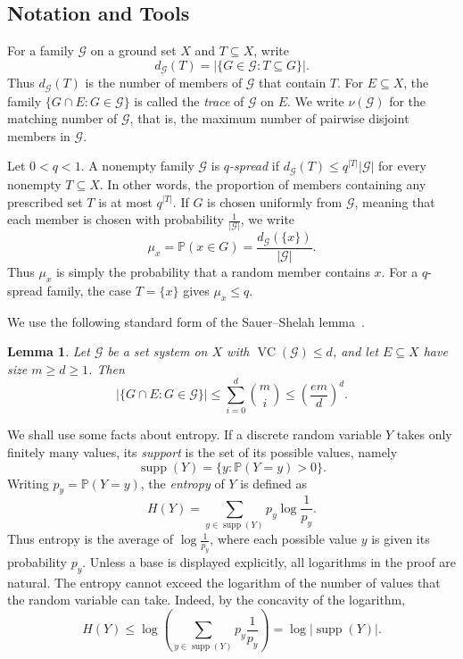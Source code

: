 \documentclass[11pt]{article}
\newtheorem{lemma}[theorem]{Lemma}
\theoremstyle{definition}
\newcommand*{\abs}[1]{\lvert#1\rvert}
\newcommand{\cG}{\mathcal{G}}
\newcommand{\VC}{\operatorname{VC}}
\begin{document}
\subsection{Notation and Tools}
For a family \(\cG\) on a ground set \(X\) and \(T\subseteq X\), write
\[
d_{\cG}(T)=\abs{\{G\in\cG:T\subseteq G\}}.
\]
Thus \(d_{\cG}(T)\) is the number of members of \(\cG\) that contain \(T\).
For \(E\subseteq X\), the family \(\{G\cap E:G\in\cG\}\) is called the \emph{trace} of \(\cG\) on \(E\). We write \(\nu(\cG)\) for the matching number of \(\cG\), that is, the maximum number of pairwise disjoint members in \(\cG\).

Let \(0<q<1\). A nonempty family \(\cG\) is \emph{\(q\)-spread} if \(d_{\cG}(T)\le q^{\abs{T}}\abs{\cG}\) for every nonempty \(T\subseteq X\). In other words, the proportion of members containing any prescribed set \(T\) is at most \(q^{\abs{T}}\). If \(G\) is chosen uniformly from \(\cG\), meaning that each member is chosen with probability \(\frac{1}{\abs{\cG}}\), we write
\[
\mu_{x}=\mathbb{P}(x\in G)=\frac{d_{\cG}(\{x\})}{\abs{\cG}}.
\]
Thus \(\mu_{x}\) is simply the probability that a random member contains \(x\). For a \(q\)-spread family, the case \(T=\{x\}\) gives \(\mu_{x}\le q\).

We use the following standard form of the Sauer--Shelah lemma~\cite{Sauer72,Shelah72,VC71}.

\begin{lemma}\label{lem:sauer}
Let \(\cG\) be a set system on \(X\) with \(\VC(\cG)\le d\), and let \(E\subseteq X\) have size \(m\ge d\ge 1\). Then
\[
\abs{\{G\cap E:G\in\cG\}}\le \sum_{i=0}^{d}\binom{m}{i}\le \left(\frac{em}{d}\right)^{d}.
\]
\end{lemma}

We shall use some facts about entropy. If a discrete random variable \(Y\) takes only finitely many values, its \emph{support} is the set of its possible values, namely
\[
\operatorname{supp}(Y)=\{y:\mathbb{P}(Y=y)>0\}.
\]
Writing \(p_{y}=\mathbb{P}(Y=y)\), the \emph{entropy} of \(Y\) is defined as
\[
H(Y)=\sum_{y\in\operatorname{supp}(Y)}p_{y}\log\frac{1}{p_{y}}.
\]
Thus entropy is the average of \(\log\frac{1}{p_{y}}\), where each possible value \(y\) is given its probability \(p_{y}\). Unless a base is displayed explicitly, all logarithms in the proof are natural. The entropy cannot exceed the logarithm of the number of values that the random variable can take. Indeed, by the concavity of the logarithm,
\begin{equation}\label{eq:concavity}
H(Y)\le \log\left(\sum_{y\in\operatorname{supp}(Y)}p_{y}\frac{1}{p_{y}}\right)
=\log\abs{\operatorname{supp}(Y)}.
\end{equation}
\end{document}
